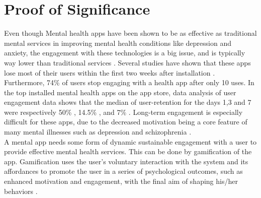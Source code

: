 \documentclass[manuscript,screen,review]{acmart}
\begin{document}
\section{Proof of Significance}
Even though Mental health apps have been shown to be as effective as traditional mental services in improving mental health conditions like depression and anxiety, the engagement with these technologies is a big issue, and is typically way lower than traditional services \cite{Borghouts21}. Several studies have shown that these apps lose most of their users within the first two weeks after installation \cite{Auf21}. Furthermore, 74\% of users stop engaging with a health app after only 10 uses. In the top installed mental health apps on the app store, data analysis of user engagement data shows that the median of user-retention for the days 1,3 and 7 were respectively 50\% , 14.5\% , and 7\% \cite{Auf21}. Long-term engagement is especially difficult for these apps, due to the decreased motivation being a core feature of many mental illnesses such as depression and schizophrenia \cite{Torous18}.
\\
A mental app needs some form of dynamic sustainable engagement with a user to provide effective mental health services. This can be done by gamification of the app. Gamification uses the user’s voluntary interaction with the system and its affordances to promote the user in a series of psychological outcomes, such as enhanced motivation and engagement, with the final aim of shaping his/her behaviors \cite{Bitrian21}.
\end{document}

